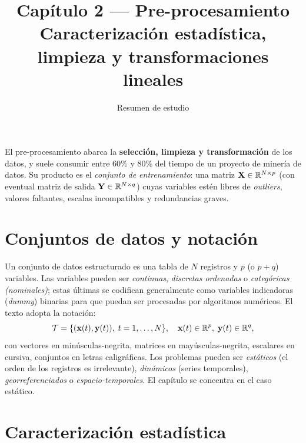 

\title{\sffamily\bfseries Capítulo 2 — Pre-procesamiento\\
       \large Caracterización estadística, limpieza y transformaciones lineales}
\author{Resumen de estudio}
\date{}


\maketitle
\thispagestyle{fancy}

\begin{conceito}
El pre-procesamiento abarca la \textbf{selección, limpieza y
transformación} de los datos, y suele consumir entre 60\% y 80\% del
tiempo de un proyecto de minería de datos. Su producto es el
\emph{conjunto de entrenamiento}: una matriz $\mathbf{X}\in\mathbb{R}^{N\times
p}$ (con eventual matriz de salida $\mathbf{Y}\in\mathbb{R}^{N\times q}$) cuyas
variables estén libres de \emph{outliers}, valores faltantes, escalas
incompatibles y redundancias graves.
\end{conceito}

\section{Conjuntos de datos y notación}

Un conjunto de datos estructurado es una tabla de $N$ registros y $p$
(o $p+q$) variables. Las variables pueden ser \emph{continuas},
\emph{discretas ordenadas} o \emph{categóricas (nominales)}; estas
últimas se codifican generalmente como variables indicadoras
(\emph{dummy}) binarias para que puedan ser procesadas por algoritmos
numéricos. El texto adopta la notación:
\[
\mathcal{T} = \{(\mathbf{x}(t),\mathbf{y}(t)),\; t=1,\dots,N\},\quad
\mathbf{x}(t)\in\mathbb{R}^p,\;\mathbf{y}(t)\in\mathbb{R}^q,
\]
con vectores en minúsculas-negrita, matrices en mayúsculas-negrita,
escalares en cursiva, conjuntos en letras caligráficas. Los problemas
pueden ser \emph{estáticos} (el orden de los registros es irrelevante),
\emph{dinámicos} (series temporales), \emph{georreferenciados} o
\emph{espacio-temporales}. El capítulo se concentra en el caso
estático.

\section{Caracterización estadística}

